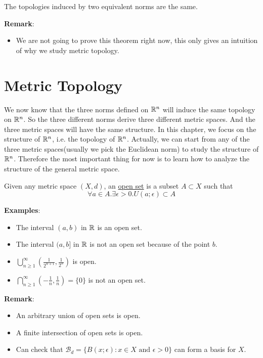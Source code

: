 \begin{theorem*} \label{topology induced by eq norms}
    The topologies induced by two equivalent norms are the same.
\end{theorem*}
\noindent \textbf{Remark}:
\begin{itemize}
    \item We are not going to prove this theorem right now, this only gives an intuition of why we study metric topology.
\end{itemize}

\section{Metric Topology}
We now know that the three norms defined on $\mathbb{R}^n$ will induce the same topology on $\mathbb{R}^n$. 
So the three different norms derive three different metric spaces. And the three metric spaces will have the same structure. 
In this chapter, we focus on the structure of $\mathbb{R}^n$, i.e. the topology of $\mathbb{R}^n$. Actually, we can start from any of the three metric spaces(usually we pick the Euclidean norm) to study the structure of $\mathbb{R}^n$.
Therefore the most important thing for now is to learn how to analyze the structure of the general metric space.
\begin{definition}
    Given any metric space $(X,d)$, an \underline{open set} is a subset $A \subset X$ such that $$\forall a \in A. \exists \epsilon >0. U(a;\epsilon) \subset A$$
\end{definition}
\noindent \textbf{Examples}:
\begin{itemize}
    \item The interval $(a,b)$ in $\mathbb{R}$ is an open set.
    \item The interval $(a,b]$ in $\mathbb{R}$ is not an open set because of the point $b$.
    \item $\bigcup_{n \geq 1}^{\infty}(\frac{1}{2^{n+1}},\frac{1}{2^n})$ is open.
    \item $\bigcap_{n \geq 1}^{\infty}(-\frac{1}{n},\frac{1}{n})=\{0\}$ is not an open set.
\end{itemize}
\noindent \textbf{Remark}:
\begin{itemize}
    \item An arbitrary union of open sets is open.
    \item A finite intersection of open sets is open.
    \item Can check that $\mathcal{B}_d=\{B(x;\epsilon):x\in X\text{ and }\epsilon>0\}$ can form a basis for $X$.
\end{itemize}


